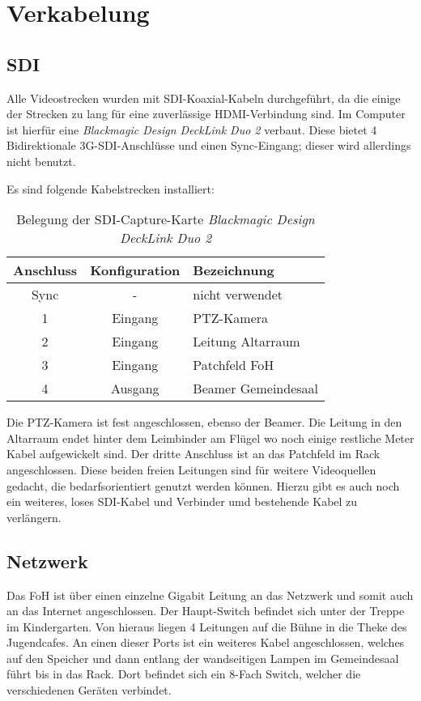 \chapter{Verkabelung}
	\section{SDI}
		Alle Videostrecken wurden mit \Gls{SDI}-Koaxial-Kabeln durchgeführt, da die einige der Strecken zu lang für eine zuverlässige HDMI-Verbindung sind. Im Computer ist hierfür eine \textit{Blackmagic Design DeckLink Duo 2} verbaut. Diese bietet 4 Bidirektionale 3G-\Gls{SDI}-Anschlüsse und einen Sync-Eingang; dieser wird allerdings nicht benutzt.

		Es sind folgende Kabelstrecken installiert:
		\begin{table}[h]
			\caption{Belegung der \Gls{SDI}-Capture-Karte \textit{Blackmagic Design DeckLink Duo 2}}
			\centering
			
			\begin{tabular}{ccl}
				\toprule
				Anschluss & Konfiguration & Bezeichnung \\
				\midrule
				Sync & - & nicht verwendet \\
				1 & Eingang & \Gls{PTZ-Kamera} \\
				2 & Eingang & Leitung Altarraum \\
				3 & Eingang & Patchfeld \Gls{FoH} \\
				4 & Ausgang & Beamer Gemeindesaal \\
				\bottomrule
			\end{tabular}
		\end{table}

		Die PTZ-Kamera ist fest angeschlossen, ebenso der Beamer. Die Leitung in den Altarraum endet hinter dem Leimbinder am Flügel wo noch einige restliche Meter Kabel aufgewickelt sind. Der dritte Anschluss ist an das Patchfeld im Rack angeschlossen. Diese beiden freien Leitungen sind für weitere Videoquellen gedacht, die bedarfsorientiert genutzt werden können. Hierzu gibt es auch noch ein weiteres, loses \Gls{SDI}-Kabel und Verbinder umd bestehende Kabel zu verlängern.

	\section{Netzwerk}
		Das \Gls{FoH} ist über einen einzelne Gigabit Leitung an das Netzwerk und somit auch an das Internet angeschlossen. Der Haupt-Switch befindet sich unter der Treppe im Kindergarten. Von hieraus liegen 4 Leitungen auf die Bühne in die Theke des Jugendcafes. An einen dieser Ports ist ein weiteres Kabel angeschlossen, welches auf den Speicher und dann entlang der wandseitigen Lampen im Gemeindesaal führt bis in das Rack. Dort befindet sich ein 8-Fach Switch, welcher die verschiedenen Geräten verbindet.

